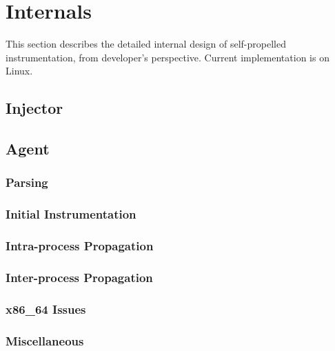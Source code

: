 \section{Internals}

This section describes the detailed internal design of self-propelled
instrumentation, from developer's perspective.
Current implementation is on Linux.

\subsection{Injector}

\subsection{Agent}
\subsubsection{Parsing}
\subsubsection{Initial Instrumentation}
\subsubsection{Intra-process Propagation}
\subsubsection{Inter-process Propagation}
\subsubsection{x86\_64 Issues}
\subsubsection{Miscellaneous}



